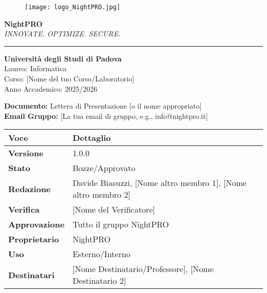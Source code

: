 \documentclass[12pt, a4paper]{article}
\title{} %
\author{} %
\begin{document}

\begin{figure}[h]
    \centering
    \texttt{[image: logo\_NightPRO.jpg]} %
    
\end{figure}

\begin{center}
    \textbf{\Large NightPRO} \\
    \textit{INNOVATE. OPTIMIZE. SECURE.} \\
    \vspace{0.5cm}
    \rule{\linewidth}{0.8pt} %
    \vspace{0.5cm}
    
    \textbf{Università degli Studi di Padova} \\
    Laurea: Informatica \\
    Corso: [Nome del tuo Corso/Laboratorio] \\ %
    Anno Accademico: 2025/2026 \\
    \vspace{0.5cm}
    
    \textbf{Documento:} Lettera di Presentazione [o il nome appropriato] \\
    \textbf{Email Gruppo:} [La tua email di gruppo, e.g., info@nightpro.it] \\
\end{center}

\vspace{1cm}

\begin{longtable}{|p{2.5cm}|p{8cm}|}
    \hline
    \textbf{Voce} & \textbf{Dettaglio} \\
    \hline
    \endhead %
    
    \hline
    \textbf{Versione} & 1.0.0 \\
    \hline
    \textbf{Stato} & Bozze/Approvato \\
    \hline
    \textbf{Redazione} & Davide Biasuzzi, [Nome altro membro 1], [Nome altro membro 2] \\
    \hline
    \textbf{Verifica} & [Nome del Verificatore] \\
    \hline
    \textbf{Approvazione} & Tutto il gruppo NightPRO \\
    \hline
    \textbf{Proprietario} & NightPRO \\
    \hline
    \textbf{Uso} & Esterno/Interno \\
    \hline
    \textbf{Destinatari} & [Nome Destinatario/Professore], [Nome Destinatario 2] \\
    \hline
\end{longtable}
\end{document}

